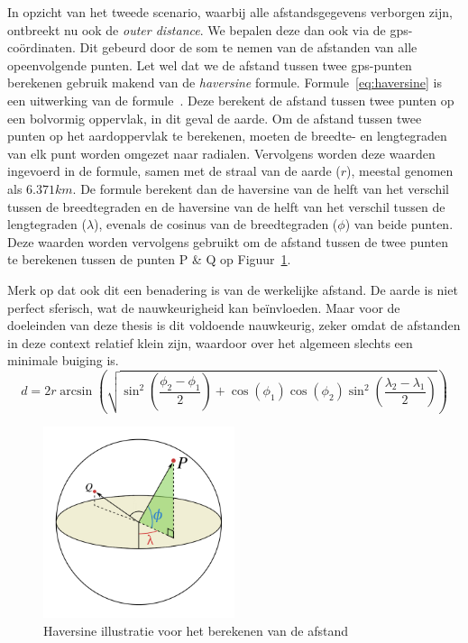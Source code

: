 In opzicht van het tweede scenario, waarbij alle afstandsgegevens verborgen
zijn, ontbreekt nu ook de \textit{outer distance}. We bepalen deze dan ook via
de \ac{gps}-coördinaten. Dit gebeurd door de som te nemen van de afstanden van
alle opeenvolgende punten. Let wel dat we de afstand tussen twee
\ac{gps}-punten berekenen gebruik makend van de \textit{haversine} formule.
Formule~\ref{eq:haversine} is een uitwerking van de
formule~\cite{sheppard1922practical}. Deze berekent de afstand tussen twee
punten op een bolvormig oppervlak, in dit geval de aarde. Om de afstand tussen
twee punten op het aardoppervlak te berekenen, moeten de breedte- en
lengtegraden van elk punt worden omgezet naar radialen. Vervolgens worden deze
waarden ingevoerd in de formule, samen met de straal van de aarde ($r$),
meestal genomen als $6.371 km$. De formule berekent dan de haversine van de
helft van het verschil tussen de breedtegraden en de haversine van de helft van
het verschil tussen de lengtegraden ($\lambda$), evenals de cosinus van de
breedtegraden ($\phi$) van beide punten. Deze waarden worden vervolgens
gebruikt om de afstand tussen de twee punten te berekenen tussen de punten P \&
Q op Figuur~\ref{fig:haversine}.

Merk op dat ook dit een benadering is van de werkelijke afstand. De aarde is
niet perfect sferisch, wat de nauwkeurigheid kan beïnvloeden. Maar voor de
doeleinden van deze thesis is dit voldoende nauwkeurig, zeker omdat de
afstanden in deze context relatief klein zijn, waardoor over het algemeen
slechts een minimale buiging is.
\begin{equation}\label{eq:haversine}
    d = 2r \arcsin\left(\sqrt{\sin^2\left(\frac{\phi_2-\phi_1}{2}\right)+\cos(\phi_1)\cos(\phi_2)\sin^2\left(\frac{\lambda_2-\lambda_1}{2}\right)}\right)
\end{equation}
\begin{figure}[h]
    \centering
    \includegraphics[width=0.5\textwidth]{fig/haversine.png}
    \caption{Haversine illustratie voor het berekenen van de afstand~\cite{Distance97:online}}\label{fig:haversine}
\end{figure}

